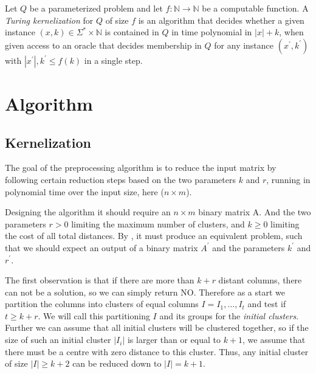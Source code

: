 \documentclass[a4paper]{article}
\begin{document}
\begin{theoremdefinition}{\cite[p.~314]{param_algo_book} \label{def:turing-kernelization}}
    Let $Q$ be a parameterized problem and let $f:\mathbb{N} \rightarrow \mathbb{N} $
    be a computable function. A \textit{Turing kernelization} for $Q$ of size $f$ is an
    algorithm that decides whether a given instance $(x,k) \in \Sigma^* \times \mathbb{N}$
    is contained in $Q$ in time polynomial in $|x|+k$, when given access to an oracle
    that decides membership in $Q$ for any instance $(x^\prime, k^\prime)$ with
    $|x^\prime|,k^\prime \leq f(k)$ in a single step.
\end{theoremdefinition}

%
%

\newpage

\section{Algorithm}
\label{sec:algo}
\subsection{Kernelization}
\label{sec:algo:kernel}
The goal of the preprocessing algorithm is to reduce the input matrix by following certain reduction steps
based on the two parameters $k$ and $r$, running in polynomial time over the input size, here ($n \times m$).

Designing the algorithm it should require an $n \times m$ binary matrix A. And the two parameters $r > 0$ limiting the
maximum number of clusters, and $k \geq 0$ limiting the cost of all total distances. By , it must
produce an equivalent problem, such that we should expect an output of a binary matrix $A^\prime$ and the parameters $k^\prime$
and $r^\prime$.

The first observation is that if there are more than $k+r$ distant columns, there can not be a solution, so we can simply return NO.
Therefore as a start we partition the columns into clusters of equal columns $I = {I_1, \dots, I_t}$ and test if $t \ge k+r$.
We will call this partitioning $I$ and its groups for the \textit{initial clusters}. Further we can assume that all initial
clusters will be clustered together, so if the size of such an initial cluster $|I_i|$ is larger than or equal to $k+1$,
we assume that there must be a centre with zero distance to this cluster. Thus, any initial cluster of size $|I| \geq k+2$
can be reduced down to $|I| = k+1$.
\end{document}
